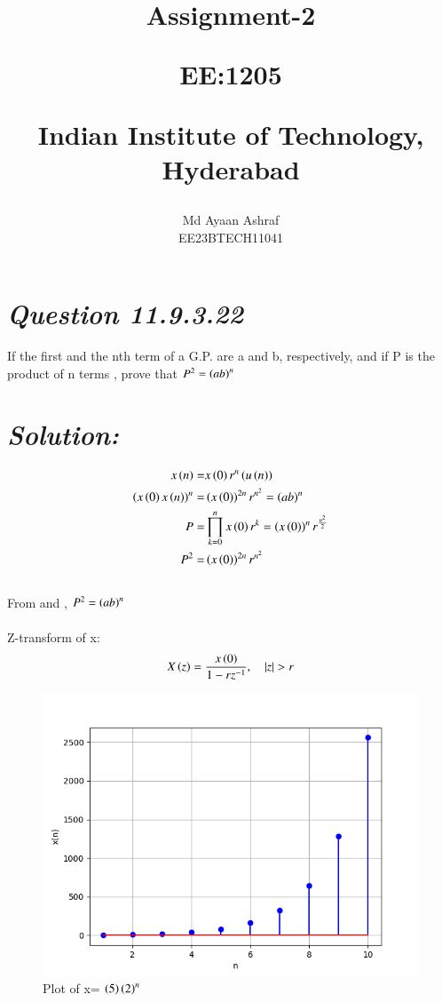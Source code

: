 \documentclass[journal,12pt,twocolumn]{IEEEtran}
\theoremstyle{remark}
\begin{document}
%




\vspace{3cm}

\title{
Assignment-2

\large{EE:1205 }

Indian Institute of Technology, Hyderabad
}
\author{Md Ayaan Ashraf

EE23BTECH11041
}  
\maketitle
\newpage
\bigskip
\renewcommand{\thefigure}{\theenumi}
\renewcommand{\thetable}{\theenumi}
\section*{\textit{\textbf{Question 11.9.3.22}}}
 If the first and the nth term of a G.P. are a and b, respectively, and if P is the product of n terms , prove that $ P^2 = \left(ab\right)^n $
\section*{\textit{\textbf{Solution:}}}

\begin{align}
x\left(n\right) = & x\left(0\right)r^{n} \left(u\left(n\right)\right)\\
\left(x\left(0\right)x\left(n\right)\right)^n = & \left(x\left(0\right)\right)^{2n} r^{n^2}= \left(ab\right)^n\\
P =& \prod_{k=0}^{n} x\left(0\right)r^{k}= \left(x\left(0\right)\right)^n r^{\frac{n^2}{2}}\\
P^2 =& \left(x\left(0\right)\right)^{2n} r^{n^2}
\end{align}
\\
From  and  , $ P^2 = \left(ab\right)^n $\\
\\
Z-transform of x:
\begin{align}
X\brak{z}= \frac{x\brak{0}}{1-rz^{-1}} , \quad{|z|>r}
\end{align}
\begin{figure}[ht]
    \centering
    \includegraphics[width=\columnwidth]{figs/fig.png}
    \caption{Plot of x= $\left(5\right)\left(2\right)^n$}
    \label{fig: 11.9.3.22}
\end{figure}
\end{document}
